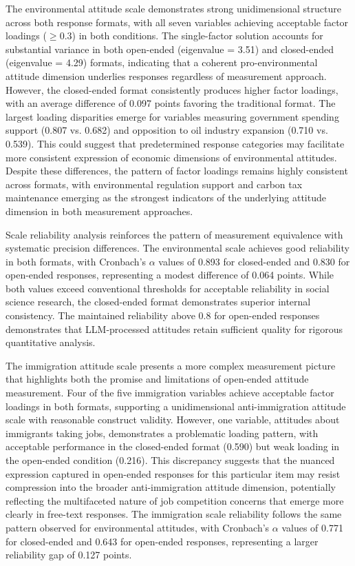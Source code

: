 \documentclass[
  journal=ram,
  manuscript=article-type,
  year=2025,
  volume=unpublished,
]{cup-journal}
\begin{document}
The environmental attitude scale demonstrates strong unidimensional structure across both response formats, with all seven variables achieving acceptable factor loadings ($\geq 0.3$) in both conditions.
The single-factor solution accounts for substantial variance in both open-ended (eigenvalue = 3.51) and closed-ended (eigenvalue = 4.29) formats, indicating that a coherent pro-environmental attitude dimension underlies responses regardless of measurement approach.
However, the closed-ended format consistently produces higher factor loadings, with an average difference of 0.097 points favoring the traditional format.
The largest loading disparities emerge for variables measuring government spending support (0.807 vs. 0.682) and opposition to oil industry expansion (0.710 vs. 0.539).
This could suggest that predetermined response categories may facilitate more consistent expression of economic dimensions of environmental attitudes.
Despite these differences, the pattern of factor loadings remains highly consistent across formats, with environmental regulation support and carbon tax maintenance emerging as the strongest indicators of the underlying attitude dimension in both measurement approaches.

Scale reliability analysis reinforces the pattern of measurement equivalence with systematic precision differences.
The environmental scale achieves good reliability in both formats, with Cronbach’s $\alpha$ values of 0.893 for closed-ended and 0.830 for open-ended responses, representing a modest difference of 0.064 points.
While both values exceed conventional thresholds for acceptable reliability in social science research, the closed-ended format demonstrates superior internal consistency.
The maintained reliability above 0.8 for open-ended responses demonstrates that LLM-processed attitudes retain sufficient quality for rigorous quantitative analysis.

The immigration attitude scale presents a more complex measurement picture that highlights both the promise and limitations of open-ended attitude measurement.
Four of the five immigration variables achieve acceptable factor loadings in both formats, supporting a unidimensional anti-immigration attitude scale with reasonable construct validity.
However, one variable, attitudes about immigrants taking jobs, demonstrates a problematic loading pattern, with acceptable performance in the closed-ended format (0.590) but weak loading in the open-ended condition (0.216).
This discrepancy suggests that the nuanced expression captured in open-ended responses for this particular item may resist compression into the broader anti-immigration attitude dimension, potentially reflecting the multifaceted nature of job competition concerns that emerge more clearly in free-text responses.
The immigration scale reliability follows the same pattern observed for environmental attitudes, with Cronbach’s $\alpha$ values of 0.771 for closed-ended and 0.643 for open-ended responses, representing a larger reliability gap of 0.127 points.
\end{document}
